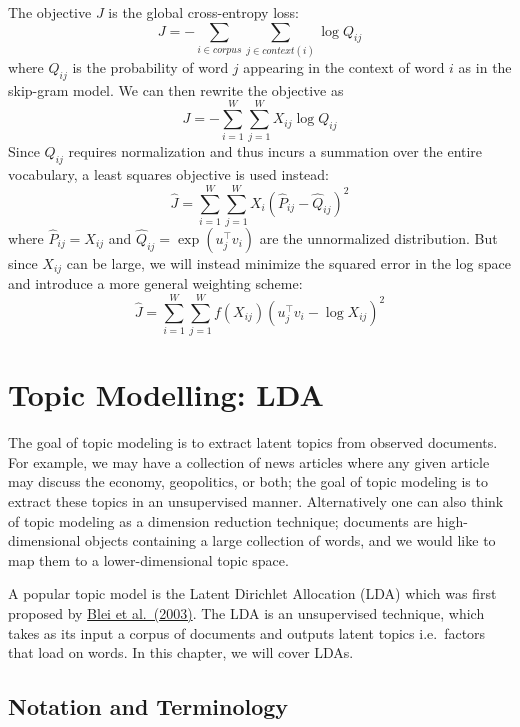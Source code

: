 \documentclass[
]{book}
\begin{document}
The objective \(J\) is the global cross-entropy loss:
\[
J = - \sum_{i\in corpus} \sum_{j\in context(i)} \log Q_{ij}
\]
where \(Q_{ij}\) is the probability of word \(j\) appearing in the context of word \(i\) as in the skip-gram model. We can then rewrite the objective as
\[
J= - \sum_{i=1}^W \sum_{j=1}^W X_{ij} \log Q_{ij}
\]
Since \(Q_{ij}\) requires normalization and thus incurs a summation over the entire vocabulary, a least squares objective is used instead:
\[
\hat{J} = \sum_{i=1}^W \sum_{j=1}^W X_i (\hat{P}_{ij} - \hat{Q}_{ij})^2
\]
where \(\hat{P}_{ij} = X_{ij}\) and \(\hat{Q}_{ij} = \exp(u_j^\top v_i)\) are the unnormalized distribution. But since \(X_{ij}\) can be large, we will instead minimize the squared error in the log space and introduce a more general weighting scheme:
\[
\hat{J} = \sum_{i=1}^W \sum_{j=1}^W f(X_{ij}) (u_j^\top v_i - \log X_{ij})^2
\]

\hypertarget{topic-modelling-lda}{%
\chapter{Topic Modelling: LDA}\label{topic-modelling-lda}}

The goal of topic modeling is to extract latent topics from observed documents. For example, we may have a collection of news articles where any given article may discuss the economy, geopolitics, or both; the goal of topic modeling is to extract these topics in an unsupervised manner. Alternatively one can also think of topic modeling as a dimension reduction technique; documents are high-dimensional objects containing a large collection of words, and we would like to map them to a lower-dimensional topic space.

A popular topic model is the Latent Dirichlet Allocation (LDA) which was first proposed by \href{https://www.jmlr.org/papers/volume3/blei03a/blei03a.pdf}{Blei et al.~(2003)}. The LDA is an unsupervised technique, which takes as its input a corpus of documents and outputs latent topics i.e.~factors that load on words. In this chapter, we will cover LDAs.

\hypertarget{notation-and-terminology}{%
\section{Notation and Terminology}\label{notation-and-terminology}}
\end{document}
